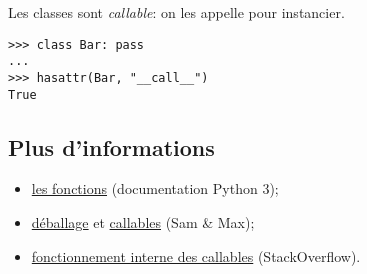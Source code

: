 Les classes sont \emph{callable}: on les appelle pour instancier.
\begin{verbatim}
>>> class Bar: pass
...
>>> hasattr(Bar, "__call__")
True
\end{verbatim}

\subsection*{Plus d'informations}
\begin{itemize}
    \item \href{https://docs.python.org/3/reference/datamodel.html\#index-32}{les fonctions} (documentation Python 3);
    \item \href{http://sametmax.com/quest-ce-que-lunpacking-en-python-et-a-quoi-ca-sert/}{déballage} et \href{http://sametmax.com/quest-ce-quun-callable-en-python/}{callables} (Sam \& Max);
    \item \href{https://stackoverflow.com/a/32856533/9214306}{fonctionnement interne des callables} (StackOverflow).
\end{itemize}

